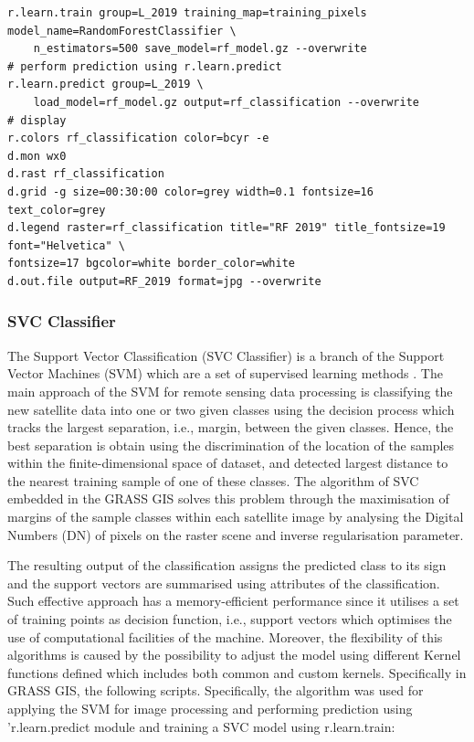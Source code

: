 \documentclass[preprint,12pt,authoryear]{elsarticle}
\begin{document}
\begin{footnotesize}
\begin{verbatim}
r.learn.train group=L_2019 training_map=training_pixels model_name=RandomForestClassifier \
    n_estimators=500 save_model=rf_model.gz --overwrite
# perform prediction using r.learn.predict
r.learn.predict group=L_2019 \
	load_model=rf_model.gz output=rf_classification --overwrite
# display
r.colors rf_classification color=bcyr -e
d.mon wx0
d.rast rf_classification
d.grid -g size=00:30:00 color=grey width=0.1 fontsize=16 text_color=grey
d.legend raster=rf_classification title="RF 2019" title_fontsize=19 font="Helvetica" \
fontsize=17 bgcolor=white border_color=white
d.out.file output=RF_2019 format=jpg --overwrite
\end{verbatim}
\end{footnotesize}

\subsubsection{SVC Classifier}

The Support Vector Classification (SVC Classifier) is a branch of the Support Vector Machines (SVM) which are a set of supervised learning methods \cite{Cortes}. The main approach of the SVM for remote sensing data processing is classifying the new satellite data into one or two given classes using the decision process which tracks the largest separation, i.e., margin, between the given classes. Hence, the best separation is obtain using the discrimination of the location of the samples within the finite-dimensional space of dataset, and detected largest distance to the nearest training sample of one of these classes. The algorithm of SVC embedded in the GRASS GIS solves this problem through the maximisation of margins of the sample classes within each satellite image by analysing the Digital Numbers (DN) of pixels on the raster scene and inverse regularisation parameter. 

The resulting output of the classification assigns the predicted class to its sign and the support vectors are summarised using attributes of the classification. Such effective approach has a memory-efficient performance since it utilises a set of training points as decision function, i.e., support vectors which optimises the use of computational facilities of the machine. Moreover, the flexibility of this algorithms is caused by the possibility to adjust the model using different Kernel functions defined which includes both common and custom kernels. Specifically in GRASS GIS, the following scripts. Specifically, the algorithm was used for applying the SVM for image processing and performing prediction using 'r.learn.predict module and training a SVC model using r.learn.train:
\end{document}
